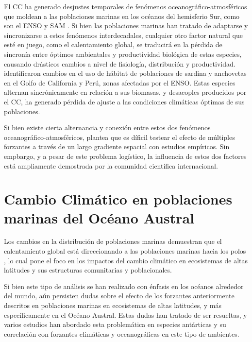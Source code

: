 \documentclass{sydneythesis}
\begin{document}
El CC ha generado desjustes temporales de fenómenos oceanográfico-atmosféricos que moldean a las poblaciones marinas en los océanos del hemisferio Sur, como son el ENSO y SAM \autocite{Saba2014,Morley2020,Lovenduski2005}. Si bien las poblaciones marinas han tratado de adaptarse y sincronizarse a estos fenómenos interdecadales, cualquier otro factor natural que esté en juego, como el calentamiento global, se traducirá en la pérdida de sincronía entre óptimos ambientales y productividad biológica de estas especies, causando drásticos cambios a nivel de fisiología, distribución y productividad. \autocite{Barange2014} identificaron cambios en el uso de hábitat de poblaciones de sardina y anchovetas en el Golfo de California y Perú, zonas afectadas por el ENSO. Estas especies alternan sincrónicamente en relación a sus biomasas, y desacoples producidos por el CC, ha generado pérdida de ajuste a las condiciones climáticas óptimas de sus poblaciones.

Si bien existe cierta alternancia y conexión entre estos dos fenómenos oceanográfico-atmosféricos, \autocite{Ehrnsten2019} plantea que es díficil testear el efecto de múltiples forzantes a través de un largo gradiente espacial con estudios empíricos. Sin empbargo, y a pesar de este problema logístico, la influencia de estos dos factores está ampliamente demostrada por la comunidad científica internacional.

\hypertarget{cambio-climuxe1tico-en-poblaciones-marinas-del-ocuxe9ano-austral}{%
\section{Cambio Climático en poblaciones marinas del Océano Austral}\label{cambio-climuxe1tico-en-poblaciones-marinas-del-ocuxe9ano-austral}}

Los cambios en la distribución de poblaciones marinas demuestran que el calentamiento global está direccionando a las poblaciones marinas hacia los polos \autocite{Perry2005,Parmesan2003}, lo cual pone el foco en los impactos del cambio climático en ecosistemas de altas latitudes y sus estructuras comunitarias y poblacionales.

Si bien este tipo de análisis se han realizado con énfasis en los océanos alrededor del mundo, aún persisten dudas sobre el efecto de los forzantes anteriormente descritos en poblaciones marinas en ecosistemas de altas latitudes, y más específicamente en el Océano Austral. Estas dudas han tratado de ser resueltas, y varios estudios han abordado esta problemática en especies antárticas y su correlación con forzantes climáticas y oceanográficas en este tipo de ambientes.
\end{document}
